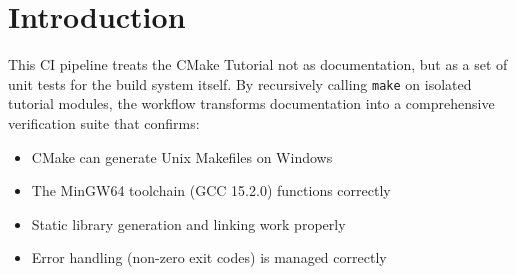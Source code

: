 \section{Introduction}
This CI pipeline treats the CMake Tutorial not as documentation, but as a set of unit tests for the build system itself. By recursively calling \texttt{make} on isolated tutorial modules, the workflow transforms documentation into a comprehensive verification suite that confirms:

\begin{itemize}
    \item CMake can generate Unix Makefiles on Windows
    \item The MinGW64 toolchain (GCC 15.2.0) functions correctly
    \item Static library generation and linking work properly
    \item Error handling (non-zero exit codes) is managed correctly
\end{itemize}

